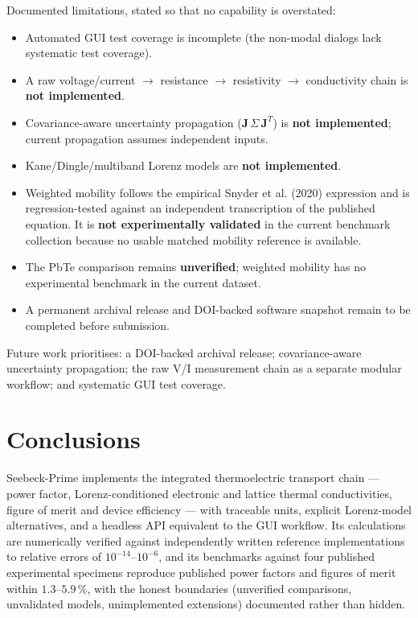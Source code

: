 \documentclass[preprint,12pt, a4paper]{elsarticle}
\begin{document}
Documented limitations, stated so that no capability is overstated:

\begin{itemize}
  \item Automated GUI test coverage is incomplete (the non-modal dialogs lack
        systematic test coverage).
  \item A raw voltage/current $\to$ resistance $\to$ resistivity $\to$
        conductivity chain is \textbf{not implemented}.
  \item Covariance-aware uncertainty propagation ($\mathbf{J}\,\Sigma\,\mathbf{J}^{T}$)
        is \textbf{not implemented}; current propagation assumes independent
        inputs.
  \item Kane/Dingle/multiband Lorenz models are \textbf{not implemented}.
  \item Weighted mobility follows the empirical Snyder et al. (2020)
        expression and is regression-tested against an independent
        transcription of the published equation. It is \textbf{not
        experimentally validated} in the current benchmark collection because
        no usable matched mobility reference is available.
  \item The PbTe comparison remains \textbf{unverified}; weighted mobility
        has no experimental benchmark in the current dataset.
  \item A permanent archival release and DOI-backed software snapshot remain
        to be completed before submission.
\end{itemize}

Future work prioritises: a DOI-backed archival release; covariance-aware
uncertainty propagation; the raw V/I measurement chain as a separate modular
workflow; and systematic GUI test coverage.


\section{Conclusions}
\label{sec:conclusions}

Seebeck-Prime implements the integrated thermoelectric transport chain ---
power factor, Lorenz-conditioned electronic and lattice thermal conductivities,
figure of merit and device efficiency --- with traceable units, explicit
Lorenz-model alternatives, and a headless API equivalent to the GUI workflow.
Its calculations are numerically verified against independently written
reference implementations to relative errors of $10^{-14}$--$10^{-6}$, and its
benchmarks against four published experimental specimens reproduce published
power factors and figures of merit within $1.3$--$5.9\,\%$, with the honest
boundaries (unverified comparisons, unvalidated models, unimplemented
extensions) documented rather than hidden.
\end{document}
